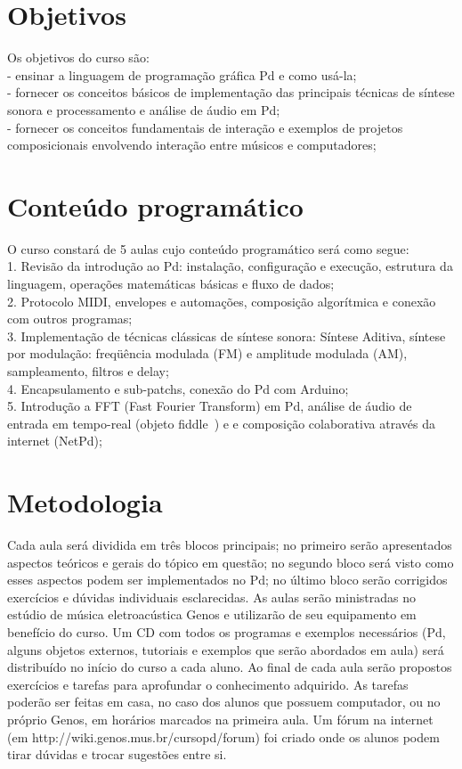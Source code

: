 \documentclass{article}
\begin{document}
\section {Objetivos}

Os objetivos do curso são:\\
- ensinar a linguagem de programação gráfica Pd e como usá-la;\\
- fornecer os conceitos básicos de implementação das principais técnicas de síntese sonora
e processamento e análise de áudio em Pd;\\
- fornecer os conceitos fundamentais de interação e exemplos de projetos composicionais
envolvendo interação entre músicos e computadores;\\

\section {Conteúdo programático}

O curso constará de 5 aulas cujo conteúdo programático será como segue:\\
1.  Revisão da introdução ao Pd:
instalação, configuração e execução, estrutura da linguagem, operações matemáticas básicas
e fluxo de dados;\\
2. Protocolo MIDI, envelopes e automações, composição algorítmica e conexão com outros programas;\\
3. Implementação de técnicas clássicas de síntese sonora: Síntese Aditiva,
síntese por modulação: freqüência modulada (FM) e amplitude modulada (AM),
sampleamento, filtros e delay;\\
4. Encapsulamento e sub-patchs, conexão do Pd com Arduino;\\
5. Introdução a FFT (Fast Fourier Transform) em Pd, análise de áudio de entrada em
tempo-real (objeto fiddle~) e e composição colaborativa através da internet (NetPd);\\

\section {Metodologia}

       Cada aula será dividida em três blocos principais; no primeiro serão apresentados
aspectos teóricos e gerais do tópico em questão; no segundo bloco será visto como esses
aspectos podem ser implementados no Pd; no último bloco serão corrigidos exercícios e
dúvidas individuais esclarecidas.
       As aulas serão ministradas no estúdio de música eletroacústica Genos e utilizarão de
seu equipamento em benefício do curso. Um CD com todos os programas e exemplos
necessários (Pd, alguns objetos externos, tutoriais e exemplos que serão abordados em aula)
será distribuído no início do curso a cada aluno. Ao final de cada aula serão propostos
exercícios e tarefas para aprofundar o conhecimento adquirido. As tarefas poderão ser feitas
em casa, no caso dos alunos que possuem computador, ou no próprio Genos, em horários
marcados        na      primeira     aula.    Um      fórum       na       internet     (em
http://wiki.genos.mus.br/cursopd/forum) foi criado onde os alunos podem tirar dúvidas e
trocar sugestões entre si.
\end{document}
